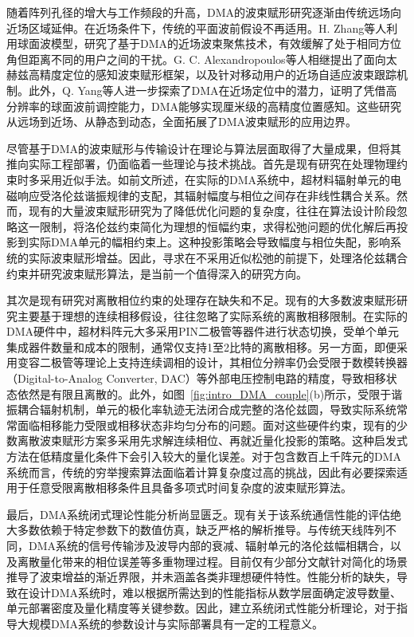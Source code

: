 随着阵列孔径的增大与工作频段的升高，DMA的波束赋形研究逐渐由传统远场向近场区域延伸。在近场条件下，传统的平面波前假设不再适用。H. Zhang等人利用球面波模型，研究了基于DMA的近场波束聚焦技术，有效缓解了处于相同方位角但距离不同的用户之间的干扰\cite{zhang2021beam,zhang2022beam}。G. C. Alexandropoulos等人相继提出了面向太赫兹高精度定位的感知波束赋形框架\cite{gavras2025near}，以及针对移动用户的近场自适应波束跟踪机制\cite{gavriilidis2025near}。此外，Q. Yang等人进一步探索了DMA在近场定位中的潜力，证明了凭借高分辨率的球面波前调控能力，DMA能够实现厘米级的高精度位置感知\cite{yang2023near,yang2025beam}。这些研究从远场到近场、从静态到动态，全面拓展了DMA波束赋形的应用边界。

尽管基于DMA的波束赋形与传输设计在理论与算法层面取得了大量成果，但将其推向实际工程部署，仍面临着一些理论与技术挑战。首先是现有研究在处理物理约束时多采用近似手法。如前文所述，在实际的DMA系统中，超材料辐射单元的电磁响应受洛伦兹谐振规律的支配，其辐射幅度与相位之间存在非线性耦合关系。然而，现有的大量波束赋形研究为了降低优化问题的复杂度，往往在算法设计阶段忽略这一限制，将洛伦兹约束简化为理想的恒幅约束\cite{zhang2021beam,zhang2022beam,yang2023near,yang2025beam}，求得松弛问题的优化解后再投影到实际DMA单元的幅相约束上。这种投影策略会导致幅度与相位失配，影响系统的实际波束赋形增益。因此，寻求在不采用近似松弛的前提下，处理洛伦兹耦合约束并研究波束赋形算法，是当前一个值得深入的研究方向。

其次是现有研究对离散相位约束的处理存在缺失和不足。现有的大多数波束赋形研究主要基于理想的连续相移假设，往往忽略了实际系统的离散相移限制。在实际的DMA硬件中，超材料阵元大多采用PIN二极管等器件进行状态切换，受单个单元集成器件数量和成本的限制，通常仅支持1至2比特的离散相移\cite{li2021programmable,deng2023reconfigurable,jabbar202460}。另一方面，即便采用变容二极管等理论上支持连续调相的设计，其相位分辨率仍会受限于数模转换器（Digital-to-Analog Converter, DAC）等外部电压控制电路的精度，导致相移状态依然是有限且离散的\cite{yang2023end}。此外，如图~\ref{fig:intro_DMA_couple}(b)所示，受限于谐振耦合辐射机制，单元的极化率轨迹无法闭合成完整的洛伦兹圆，导致实际系统常常面临相移能力受限或相移状态非均匀分布的问题。面对这些硬件约束，现有的少数离散波束赋形方案多采用先求解连续相位、再就近量化投影的策略\cite{zhang2025nearfield}。这种启发式方法在低精度量化条件下会引入较大的量化误差。对于包含数百上千阵元的DMA系统而言，传统的穷举搜索算法面临着计算复杂度过高的挑战，因此有必要探索适用于任意受限离散相移条件且具备多项式时间复杂度的波束赋形算法。

最后，DMA系统闭式理论性能分析尚显匮乏。现有关于该系统通信性能的评估绝大多数依赖于特定参数下的数值仿真，缺乏严格的解析推导\cite{chen2024beamforming,kimaryo2023downlink}。与传统天线阵列不同，DMA系统的信号传输涉及波导内部的衰减、辐射单元的洛伦兹幅相耦合，以及离散量化带来的相位误差等多重物理过程。目前仅有少部分文献针对简化的场景推导了波束增益的渐近界限\cite{gavriilidis2025how}，并未涵盖各类非理想硬件特性。性能分析的缺失，导致在设计DMA系统时，难以根据所需达到的性能指标从数学层面确定波导数量、单元部署密度及量化精度等关键参数。因此，建立系统闭式性能分析理论，对于指导大规模DMA系统的参数设计与实际部署具有一定的工程意义。

